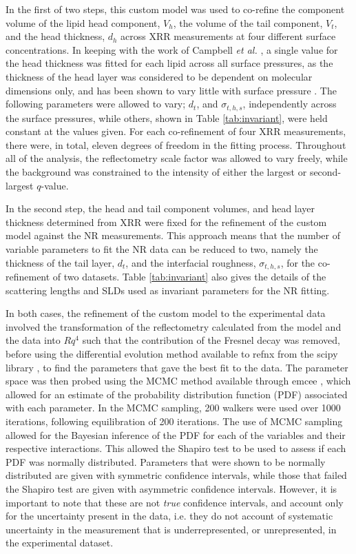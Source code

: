 \documentclass[amsmath,amssymb,twocolumn,superscriptaddress]{revtex4-1}
\begin{document}
In the first of two steps, this custom model was used to co-refine the component volume of the lipid head component, $V_h$, the volume of the tail component, $V_t$, and the head thickness, $d_h$ across XRR measurements at four different surface concentrations.
In keeping with the work of Campbell \emph{et al.} \cite{campbell_structure_2018}, a single value for the head thickness was fitted for each lipid across all surface pressures, as the thickness of the head layer was considered to be dependent on molecular dimensions only, and has been shown to vary little with surface pressure \cite{kewalramani_effects_2010}.
The following parameters were allowed to vary; $d_t$, and $\sigma_{t,h,s}$, independently across the surface pressures, while others, shown in Table \ref{tab:invariant}, were held constant at the values given.
For each co-refinement of four XRR measurements, there were, in total, eleven degrees of freedom in the fitting process.
Throughout all of the analysis, the reflectometry scale factor was allowed to vary freely, while the background was constrained to the intensity of either the largest or second-largest $q$-value.

In the second step, the head and tail component volumes, and head layer thickness determined from XRR were fixed for the refinement of the custom model against the NR measurements.
This approach means that the number of variable parameters to fit the NR data can be reduced to two, namely the thickness of the tail layer, $d_t$, and the interfacial roughness, $\sigma_{t,h,s}$, for the co-refinement of two datasets.
Table \ref{tab:invariant} also gives the details of the scattering lengths and SLDs used as invariant parameters for the NR fitting.

In both cases, the refinement of the custom model to the experimental data involved the transformation of the reflectometry calculated from the model and the data into $Rq^4$ such that the contribution of the Fresnel decay was removed, before using the differential evolution method available to refnx from the scipy library \cite{jones_scipy_2001}, to find the parameters that gave the best fit to the data.
The parameter space was then probed using the MCMC method available through emcee \cite{foreman-mackey_emcee_2013}, which allowed for an estimate of the probability distribution function (PDF) associated with each parameter.
In the MCMC sampling, 200 walkers were used over 1000 iterations, following equilibration of 200 iterations.
The use of MCMC sampling allowed for the Bayesian inference of the PDF for each of the variables and their respective interactions.
This allowed the Shapiro test to be used to assess if each PDF was normally distributed.
Parameters that were shown to be normally distributed are given with symmetric confidence intervals, while those that failed the Shapiro test are given with asymmetric confidence intervals.
However, it is important to note that these are not \emph{true} confidence intervals, and account only for the uncertainty present in the data, i.e. they do not account of systematic uncertainty in the measurement that is underrepresented, or unrepresented, in the experimental dataset.
\end{document}
